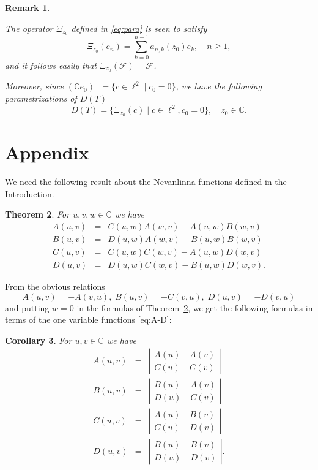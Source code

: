 \documentclass [12pt]{article}
\newtheorem{thm}{Theorem}[section]
\newtheorem{rem}[thm]{Remark}
\newtheorem{cor}[thm]{Corollary}
\newcommand{\C}{\mathbb{C}}
\newcommand{\D}{\mathbb{D}}
\begin{document}
\begin{rem}\label{thm:noninj}{\rm The operator $\Xi_{z_0}$ defined in \eqref{eq:para} is  seen to satisfy 
$$
\Xi_{z_0}(e_n)=\sum_{k=0}^{n-1} a_{n,k}(z_0) e_k,\quad n\ge 1,
$$
and it follows easily that $\Xi_{z_0}(\mathcal F)=\mathcal F$.

Moreover, since $(\C e_0)^\perp=\{c\in\ell^2 \mid c_0=0\}$, we 
have the following parametrizations of $D(T)$
$$
D(T)=\{\Xi_{z_0}(c) \mid c\in\ell^2, c_0=0\},\quad z_0\in\C.
$$ 
}
\end{rem}









\section{Appendix}
We need the following result about the Nevanlinna functions defined in the Introduction.

\begin{thm}\label{thm:3points} For $u,v,w\in\C$ we have
\begin{eqnarray}
A(u,v)&=& C(u,w)A(w,v)-A(u,w)B(w,v)\label{eq:A3}\\
B(u,v)&=& D(u,w)A(w,v)-B(u,w)B(w,v)\label{eq:B3}\\
C(u,v)&=& C(u,w)C(w,v)-A(u,w)D(w,v)\label{eq:C3}\\
D(u,v)&=& D(u,w)C(w,v)-B(u,w)D(w,v)\label{eq:D3}.
\end{eqnarray}
\end{thm}

From the obvious relations
 $$
 A(u,v)=-A(v,u),\; B(u,v)=-C(v,u),\; D(u,v)=-D(v,u) 
 $$
 and putting $w=0$ in the formulas of Theorem~\ref{thm:3points}, we get the following formulas in terms of the one variable functions \eqref{eq:A-D}:
 
 \begin{cor}\label{thm:2to1} For $u, v\in\C$ we have
 \begin{eqnarray}
A(u,v)&=& \left|\begin{array}{cc}
 A(u)&\;A(v)\\C(u)&\;C(v)\end{array}\right|\label{eq:A1}\\
 B(u,v)&=& \left|\begin{array}{cc}
 B(u)&\;A(v)\\D(u)&\;C(v)\end{array}\right|\label{eq:B1}\\
  C(u,v)&=& \left|\begin{array}{cc}
 A(u)&\;B(v)\\C(u)&\;D(v)\end{array}\right|\label{eq:C1}\\
  D(u,v)&=& \left|\begin{array}{cc}
 B(u)&\;B(v)\\D(u)&\;D(v)\end{array}\right|\label{eq:D1}.
 \end{eqnarray}
\end{cor}
\end{document}
